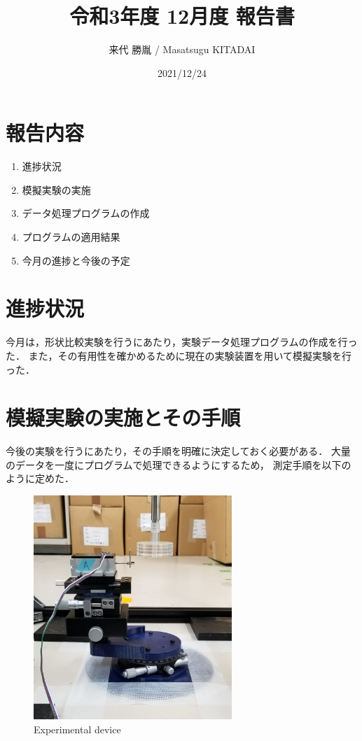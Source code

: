 \documentclass[twocolumn,a4j]{jsarticle}
\author{来代 勝胤 / Masatsugu KITADAI}
\title{令和3年度 12月度 報告書}
\date{2021/12/24}
\begin{document}
\columnseprule=0.1mm

\maketitle
\section*{報告内容}
\begin{enumerate}[1.]
    \item 進捗状況
    \item 模擬実験の実施
    \item データ処理プログラムの作成
    \item プログラムの適用結果
    \item 今月の進捗と今後の予定
\end{enumerate}

\section{進捗状況}
今月は，形状比較実験を行うにあたり，実験データ処理プログラムの作成を行った．
また，その有用性を確かめるために現在の実験装置を用いて模擬実験を行った．

\section{模擬実験の実施とその手順}
今後の実験を行うにあたり，その手順を明確に決定しておく必要がある．
大量のデータを一度にプログラムで処理できるようにするため，
測定手順を以下のように定めた．\\

\begin{figure}[htbp]
    \footnotesize
    \begin{center}
        \includegraphics[width=75mm]{../images_3/device_1.jpg}
        \caption{Experimental device}
    \end{center}
\end{figure}
\end{document}
